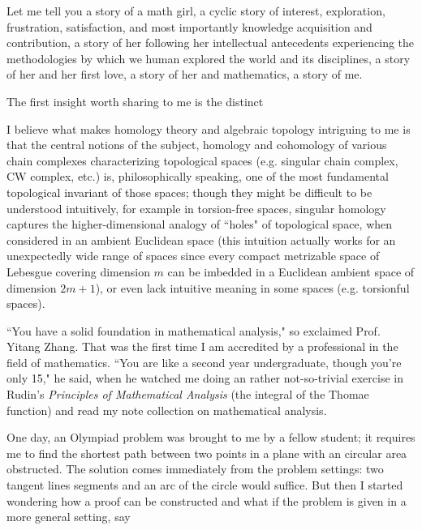 \documentclass[10pt]{article}
\begin{document}
\begin{CJK*}{UTF8}{gbsn}
\newpage
Let me tell you a story of a math girl, a cyclic story of interest, exploration, frustration, satisfaction, and most importantly knowledge acquisition and contribution, a story of her following her intellectual antecedents experiencing the methodologies by which we human explored the world and its disciplines, a story of her and her first love, a story of her and mathematics, a story of me.

The first insight worth sharing to me is the distinct 

I believe what makes homology theory and algebraic topology intriguing to me is that the central notions of the subject, homology and cohomology of various chain complexes characterizing topological spaces (e.g. singular chain complex, CW complex, etc.) is, philosophically speaking, one of the most fundamental topological invariant of those spaces; though they might be difficult to be understood intuitively, for example in torsion-free spaces, singular homology captures the higher-dimensional analogy of ``holes" of topological space, when considered in an ambient Euclidean space (this intuition actually works for an unexpectedly wide range of spaces since every compact metrizable space of Lebesgue covering dimension $m$ can be imbedded in a Euclidean ambient space of dimension $2m+1$), or even lack intuitive meaning in some spaces (e.g. torsionful spaces).

\noindent\makebox[\linewidth]{\rule{\paperwidth}{0.4pt}}

``You have a solid foundation in mathematical analysis," so exclaimed Prof. Yitang Zhang. That was the first time I am accredited by a professional in the field of mathematics. ``You are like a second year undergraduate, though you're only 15," he said, when he watched me doing an rather not-so-trivial exercise in Rudin's \textit{Principles of Mathematical Analysis} (the integral of the Thomae function) and read my note collection on mathematical analysis.

\noindent\makebox[\linewidth]{\rule{\paperwidth}{0.4pt}}

One day, an Olympiad problem was brought to me by a fellow student; it requires me to find the shortest path between two points in a plane with an circular area obstructed. The solution comes immediately from the problem settings: two tangent lines segments and an arc of the circle would suffice. But then I started wondering how a proof can be constructed and what if the problem is given in a more general setting, say 


\end{CJK*}
\end{document}
